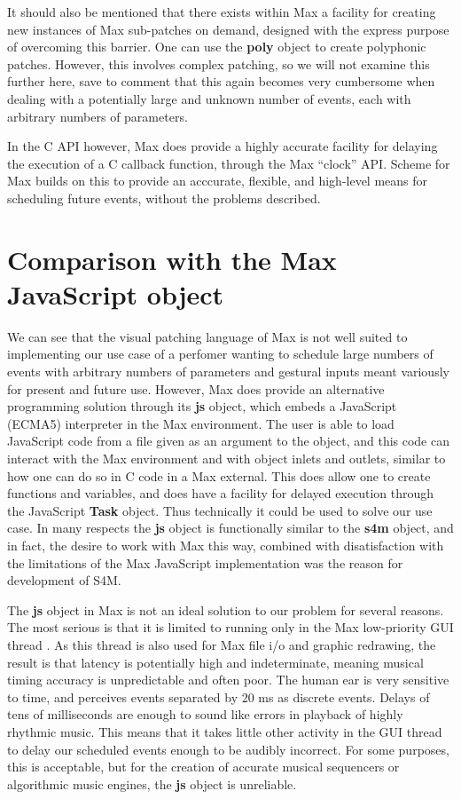 \documentclass[acmsmall]{acmart}
\begin{document}

It should also be mentioned that there exists within Max a facility for creating
new instances of Max sub-patches on demand, designed with the express purpose of
overcoming this barrier. One can use the \textbf{poly} object to create polyphonic
patches. However, this involves complex patching, so we will not examine this further here,
save to comment that this again becomes very cumbersome when dealing
with a potentially large and unknown number of events, each with arbitrary numbers
of parameters.

In the C API however, Max does provide a highly accurate facility for delaying
the execution of a C callback function, through the Max ``clock'' API. Scheme
for Max builds on this to provide an acccurate, flexible, and high-level means 
for scheduling future events, without the problems described.

\section{Comparison with the Max JavaScript object}

We can see that the visual patching language of Max is not well suited to implementing
our use case of a perfomer wanting to schedule large numbers of events with arbitrary numbers of
parameters and gestural inputs meant variously for present and future use. 
However, Max does provide an alternative programming solution through its
\textbf{js} object, which embeds a JavaScript (ECMA5) interpreter in the Max environment.
The user is able to load JavaScript code from a file given as an argument to the object,
and this code can interact with the Max environment and with object inlets and outlets,
similar to how one can do so in C code in a Max external.
This does allow one to create functions and variables, and does have a facility
for delayed execution through the JavaScript \textbf{Task} object. 
Thus technically it could be used to solve our use case.
In many respects the \textbf{js} object is functionally similar to the \textbf{s4m} object,
and in fact, the desire to work with Max this way, combined with disatisfaction with the
limitations of the Max JavaScript implementation was the reason for development of S4M.

The \textbf{js} object in Max is not an ideal solution to our problem for several reasons. 
The most serious is that it is limited to running only in the Max low-priority GUI thread \cite{Cycling74}.
As this thread is also used for Max file i/o and graphic redrawing, the result is that latency
is potentially high and indeterminate, meaning musical timing accuracy is unpredictable and often poor.
The human ear is very sensitive to time, and perceives events separated by 20 ms as discrete
events. 
Delays of tens of milliseconds are enough to sound like errors in playback
of highly rhythmic music. This means that it takes little other activity in the
GUI thread to delay our scheduled events enough to be audibly incorrect. 
For some purposes, this is acceptable, but for the creation of accurate 
musical sequencers or algorithmic music engines, the \textbf{js} object is unreliable. 
\end{document}
